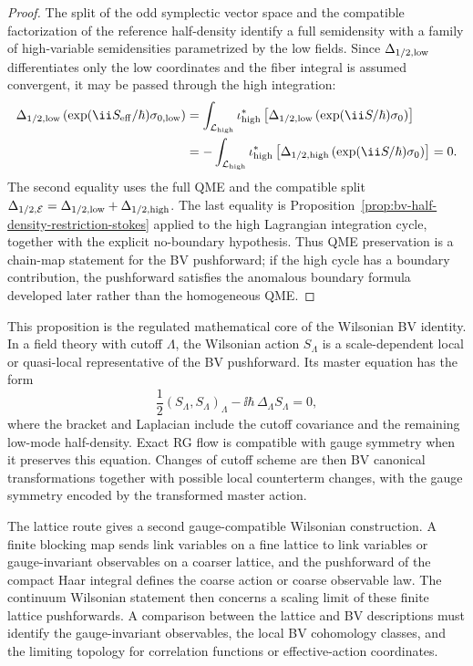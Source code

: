 \begin{proof}
The split of the odd symplectic vector space and the compatible factorization
of the reference half-density identify a full semidensity with a family of
high-variable semidensities parametrized by the low fields.  Since
\(\Delta_{1/2,{\rm low}}\) differentiates only the low coordinates and the
fiber integral is assumed convergent, it may be passed through the high
integration:
\[
\begin{aligned}
  \Delta_{1/2,{\rm low}}
  \left(\exp(\ii S_{\rm eff}/\hbar)\sigma_{0,{\rm low}}\right)
  &=
  \int_{\mathcal L_{\rm high}}
  \iota_{\rm high}^*
  \left[
    \Delta_{1/2,{\rm low}}
    \left(\exp(\ii S/\hbar)\sigma_0\right)
  \right]
\\
  &=
  -\int_{\mathcal L_{\rm high}}
  \iota_{\rm high}^*
  \left[
    \Delta_{1/2,{\rm high}}
    \left(\exp(\ii S/\hbar)\sigma_0\right)
  \right]
  =
  0 .
\end{aligned}
\]
The second equality uses the full QME and the compatible split
\(\Delta_{1/2,\mathcal E}
=\Delta_{1/2,{\rm low}}+\Delta_{1/2,{\rm high}}\).  The last equality is
Proposition~\ref{prop:bv-half-density-restriction-stokes} applied to the high
Lagrangian integration cycle, together with the explicit no-boundary
hypothesis.  Thus QME preservation is a chain-map statement for the BV
pushforward; if the high cycle has a boundary contribution, the pushforward
satisfies the anomalous boundary formula developed later rather than the
homogeneous QME.
\end{proof}

This proposition is the regulated mathematical core of the Wilsonian BV
identity.  In a field theory with cutoff \(\Lambda\), the Wilsonian action
\(S_\Lambda\) is a scale-dependent local or quasi-local representative of the
BV pushforward.  Its master equation has the form
\[
  \frac12(S_\Lambda,S_\Lambda)_\Lambda
  -
  \ii\hbar\,\Delta_\Lambda S_\Lambda
  =
  0,
\]
where the bracket and Laplacian include the cutoff covariance and the
remaining low-mode half-density.  Exact RG flow is compatible with gauge
symmetry when it preserves this equation.  Changes of cutoff scheme are then
BV canonical transformations together with possible local counterterm changes,
with the gauge symmetry encoded by the transformed master action.

The lattice route gives a second gauge-compatible Wilsonian construction.  A
finite blocking map sends link variables on a fine lattice to link variables
or gauge-invariant observables on a coarser lattice, and the pushforward of
the compact Haar integral defines the coarse action or coarse observable
law.  The continuum Wilsonian statement then concerns a scaling limit of these
finite lattice pushforwards.  A comparison between the lattice and BV
descriptions must identify the gauge-invariant observables, the local BV
cohomology classes, and the limiting topology for correlation functions or
effective-action coordinates.

